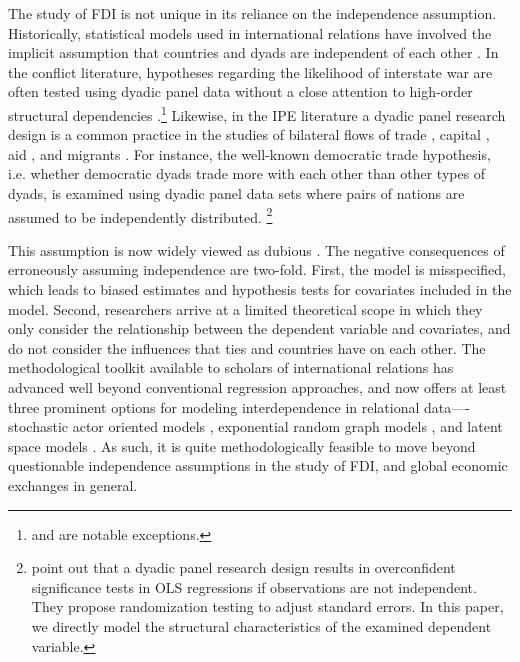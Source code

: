 \documentclass[reqno,onecolumn,letterpaper,12pt]{article}
\begin{document}
The study of FDI is not unique in its reliance on the independence assumption. Historically, statistical models used in international relations have involved the implicit assumption that countries and dyads are independent of each other \citep{diehl2016conditional,ward2007persistent}. In the conflict literature, hypotheses regarding the likelihood of interstate war are often tested using dyadic panel data without a close attention to high-order structural dependencies \citep[e.g.][]{Cranmer_Desmarais:2011}.\footnote{\citet{ward2007disputes} and \citet{ward2007persistent} are notable exceptions.} Likewise, in the IPE literature a dyadic panel research design is a common practice in the studies of bilateral flows of trade \citep[e.g.][]{Mansfield_et_al:2000,Rose:2004,Goldstein_et_al:2007,Bliss_Russett:1998,Gowa_Mansfield:1993}, capital \citep[e.g.][]{Li_Vashchilko:2010,Leblang:2010,Egger_Pfaffermayr:2004}, aid \citep[e.g.][]{BDM_Smith:2009}, and migrants \citep[e.g.][]{Fitzgerald_et_al:2014}. For instance, the well-known democratic trade hypothesis, i.e. whether democratic dyads trade more with each other than other types of dyads, is examined using dyadic panel data sets where pairs of nations are assumed to be independently distributed. \footnote{\citet{Erikson_et_al:2014} point out that a dyadic panel research design results in overconfident significance tests in OLS regressions if observations are not independent. They propose randomization testing to adjust standard errors. In this paper, we directly model the structural characteristics of the examined dependent variable. }


This assumption is now widely viewed as dubious \citep[see, e.g., ][]{ward2007persistent, chu2010homogenization,cranmer2016critique,dorff2013networks,lee2013network,howell2013geography,kinne2016agreeing}. The negative consequences of erroneously assuming independence are two-fold. First, the model is misspecified, which leads to biased estimates and hypothesis tests for covariates included in the model. Second, researchers arrive at a limited theoretical scope in which they only consider the relationship between the dependent variable and covariates, and do not consider the influences that ties and countries have on each other. The methodological toolkit available to scholars of international relations has advanced well beyond conventional regression approaches, and now offers at least three prominent options for modeling interdependence in relational data----stochastic actor oriented models \citep[e.g., ][]{camber2010geometry,kinne2016agreeing,kinne2013network,kinne2014dependent,warren2016modeling}, exponential random graph models \citep[e.g.,][]{cranmer2012complex,cranmer2012toward,raeymaeckers2016influence}, and latent space models \citep[e.g., ][]{ward2007disputes,ward2013gravity,metternich2013antigovernment}. As such, it is quite methodologically feasible to move beyond questionable independence assumptions in the study of FDI, and global economic exchanges in general.
\end{document}

